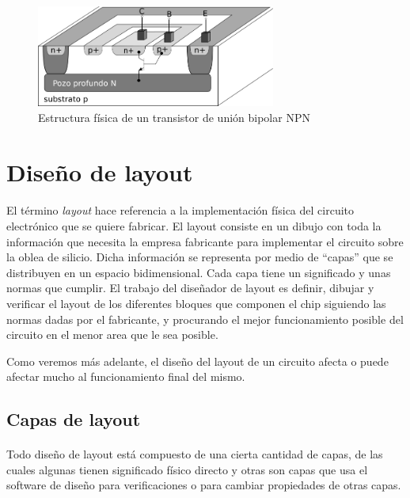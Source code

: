 \begin{figure}[h]
	\centering
	\includegraphics[width=0.7\textwidth]{img/npn.png}
	\caption{Estructura física de un transistor de unión bipolar NPN}
	\label{fig:npn}
\end{figure}


\section{Diseño de layout}\label{cap:layout}

\paragraph{}
El término \textit{layout} hace referencia a la implementación física del circuito
electrónico que se quiere fabricar. El layout consiste en un dibujo con toda
la información que necesita la empresa fabricante para implementar el circuito
sobre la oblea de silicio. Dicha información se representa por medio de ``capas''
que se distribuyen en un espacio bidimensional. Cada capa tiene un significado y
unas normas que cumplir. El trabajo del diseñador de layout es definir, dibujar y
verificar el layout de los diferentes bloques que componen el chip siguiendo
las normas dadas por el fabricante, y procurando el mejor funcionamiento posible
del circuito en el menor area que le sea posible.

Como veremos más adelante, el diseño del layout de un circuito afecta o puede afectar
mucho al funcionamiento final del mismo.

\subsection{Capas de layout}\label{cap:capas_layout}

\paragraph{}
Todo diseño de layout está compuesto de una cierta cantidad de capas, de las cuales
algunas tienen significado físico directo y otras son capas que usa el software de
diseño para verificaciones o para cambiar propiedades de otras capas.

